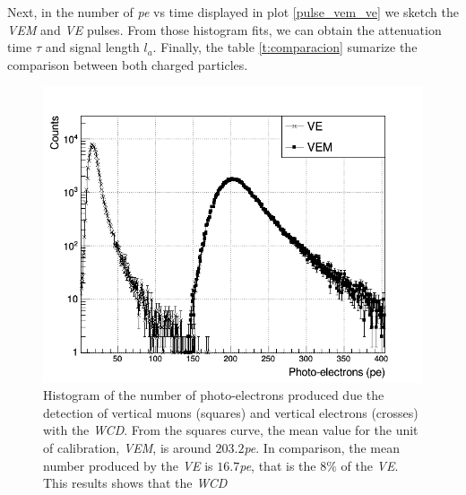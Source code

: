 \documentclass[submitting]{nst}
\begin{document}
Next, in the number of \textsl{pe} vs time displayed in plot \ref{pulse_vem_ve} we sketch  the \textsl{VEM} and \textsl{VE} pulses. From those histogram fits, we can obtain the attenuation time $\tau$ and signal length $l_a$.  Finally, the table \ref{t:comparacion} sumarize the comparison between both charged particles.
\begin{figure}
    \centering
    \includegraphics[scale=0.38]{Figures/vem_ve.png}
    \caption{Histogram of the number of photo-electrons produced due the detection of vertical muons (squares) and vertical electrons (crosses) with the \textsl{WCD}. From the squares curve, the mean value for the unit of calibration, \textsl{VEM}, is around $203.2$\textsl{pe}. In comparison, the mean number produced by the \textsl{VE} is $16.7$\textsl{pe}, that is the $8$\% of the \textsl{VE}. This results shows that the \textsl{WCD} }
    \label{vem_ve}
\end{figure}
\end{document}
